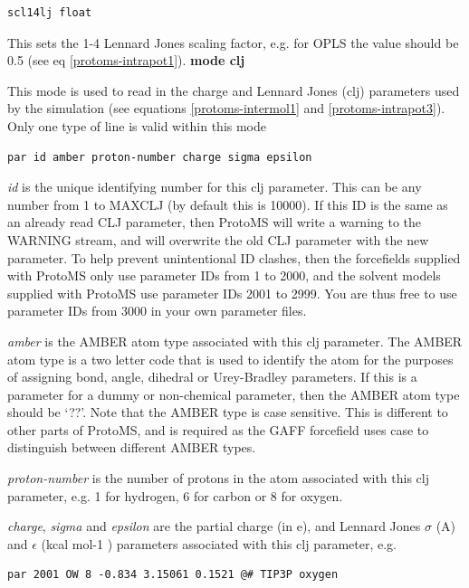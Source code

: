 \documentclass[letterpaper,10pt,english]{manual}
\begin{document}
\begin{Verbatim}[commandchars=@\[\]]
scl14lj float
\end{Verbatim}

This sets the 1-4 Lennard Jones scaling factor, e.g. for OPLS the value should be 0.5 (see eq \eqref{protoms-intrapot1}).
\textbf{mode clj}

This mode is used to read in the charge and Lennard Jones (clj) parameters used by the simulation (see equations \eqref{protoms-intermol1} and \eqref{protoms-intrapot3}). Only one type of line is valid within this mode

\begin{Verbatim}[commandchars=@\[\]]
par id amber proton-number charge sigma epsilon
\end{Verbatim}

\emph{id} is the unique identifying number for this clj parameter. This can be any number from 1 to MAXCLJ (by default this is 10000). If this ID is the same as an already read CLJ parameter, then ProtoMS will write a warning to the WARNING stream, and will overwrite the old CLJ parameter with the new parameter. To help prevent unintentional ID clashes, then the forcefields supplied with ProtoMS only use parameter IDs from 1 to 2000, and the solvent models supplied with ProtoMS use parameter IDs 2001 to 2999. You are thus free to use parameter IDs from 3000 in your own parameter files.

\emph{amber} is the AMBER atom type associated with this clj parameter. The AMBER atom type is a two letter code that is used to identify the atom for the purposes of assigning bond, angle, dihedral or Urey-Bradley parameters. If this is a parameter for a dummy or non-chemical parameter, then the AMBER atom type should be ‘??’. Note that the AMBER type is case sensitive. This is different to other parts of ProtoMS, and is required as the GAFF forcefield uses case to distinguish between different AMBER types.

\emph{proton-number} is the number of protons in the atom associated with this clj parameter, e.g. 1 for hydrogen, 6 for carbon or 8 for oxygen.

\emph{charge}, \emph{sigma} and \emph{epsilon} are the partial charge (in \textbar{}e\textbar{}), and Lennard Jones $\sigma$ (A) and $\epsilon$ (kcal mol-1 ) parameters associated with this clj parameter, e.g.

\begin{Verbatim}[commandchars=@\[\]]
par 2001 OW 8 -0.834 3.15061 0.1521 @# TIP3P oxygen
\end{Verbatim}
\end{document}
